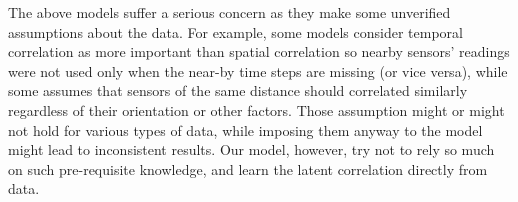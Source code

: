The above models suffer a serious concern as they make some unverified assumptions about the data. For example, some models consider temporal correlation as more important than spatial correlation so nearby sensors' readings were not used only when the near-by time steps are missing (or vice versa), while some assumes that sensors of the same distance should correlated similarly regardless of their orientation or other factors. Those assumption might or might not hold for various types of data, while imposing them anyway to the model might lead to inconsistent results. Our model, however, try not to rely so much on such pre-requisite knowledge, and learn the latent correlation directly from data.

